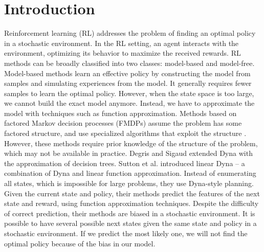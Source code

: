 

\chapter{Introduction}
\label{ch:intro}

Reinforcement learning (RL) addresses the problem of finding an optimal policy in a stochastic environment.
In the RL setting, an agent interacts with the environment, optimizing its behavior to
maximize the received rewards.
RL methods can be broadly classified into two classes: model-based and
model-free. Model-based methods learn an effective policy by
constructing the model from samples and simulating experiences from the model. It
generally requires fewer samples to learn the optimal policy. However, when the
state space is too large, we cannot build the exact model anymore. Instead, we
have to approximate the model with techniques such as function approximation. 
Methods based on factored Markov decision processes (FMDPs) assume the problem has some factored structure, and use 
specialized algorithms that exploit the structure \cite{ApproxFactor} \cite{SPUDD}. 
However, these methods require prior knowledge
of the structure of the problem, which may not be available in practice.
Degris and Sigaud \cite{ApproxTree} extended Dyna \cite{Dyna} with the approximation of decision trees.
Sutton et al. \cite{ApproxDyna} introduced linear Dyna -- a combination 
of Dyna and linear function approximation. 
Instead of enumerating all states, which is impossible for large problems, they
use Dyna-style planning. Given the current state and policy, 
their methods predict the features of the next state and reward, using function approximation
techniques. Despite the difficulty of correct prediction, their methods are biased 
in a stochastic environment. It is possible to have
several possible next states given the same state and policy in a stochastic environment.
If we predict the most likely one, we will not find the optimal policy because of the bias in our model.

